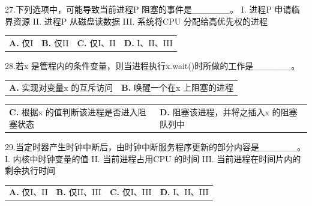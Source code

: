 \documentclass[UTF8,11pt]{ctexart}
\begin{document}
27.下列选项中，可能导致当前进程P 阻塞的事件是\_\_\_\_\_\_。 I. 进程P 申请临界资源 II. 进程P 从磁盘读数据 III. 系统将CPU 分配给高优先权的进程


\begin{center}\begin{tabular}{>{\raggedright\arraybackslash}p{\dimexpr(\linewidth-8\tabcolsep)/4\relax}>{\raggedright\arraybackslash}p{\dimexpr(\linewidth-8\tabcolsep)/4\relax}>{\raggedright\arraybackslash}p{\dimexpr(\linewidth-8\tabcolsep)/4\relax}>{\raggedright\arraybackslash}p{\dimexpr(\linewidth-8\tabcolsep)/4\relax}}
\textbf{A.} 仅I & \textbf{B.} 仅II & \textbf{C.} 仅I、II & \textbf{D.} I、II、III\\[.35em]\end{tabular}\end{center}

28.若x 是管程内的条件变量，则当进程执行x.wait()时所做的工作是\_\_\_\_\_\_。


\begin{center}\begin{tabular}{>{\raggedright\arraybackslash}p{\dimexpr(\linewidth-4\tabcolsep)/2\relax}>{\raggedright\arraybackslash}p{\dimexpr(\linewidth-4\tabcolsep)/2\relax}}
\textbf{A.} 实现对变量x 的互斥访问 & \textbf{B.} 唤醒一个在x 上阻塞的进程\\[.35em]\end{tabular}\end{center}

\begin{center}\begin{tabular}{>{\raggedright\arraybackslash}p{\dimexpr(\linewidth-4\tabcolsep)/2\relax}>{\raggedright\arraybackslash}p{\dimexpr(\linewidth-4\tabcolsep)/2\relax}}
\textbf{C.} 根据x 的值判断该进程是否进入阻塞状态 & \textbf{D.} 阻塞该进程，并将之插入x 的阻塞队列中\\[.35em]\end{tabular}\end{center}

29.当定时器产生时钟中断后，由时钟中断服务程序更新的部分内容是\_\_\_\_\_\_。 I. 内核中时钟变量的值 II. 当前进程占用CPU 的时间 III. 当前进程在时间片内的剩余执行时间


\begin{center}\begin{tabular}{>{\raggedright\arraybackslash}p{\dimexpr(\linewidth-8\tabcolsep)/4\relax}>{\raggedright\arraybackslash}p{\dimexpr(\linewidth-8\tabcolsep)/4\relax}>{\raggedright\arraybackslash}p{\dimexpr(\linewidth-8\tabcolsep)/4\relax}>{\raggedright\arraybackslash}p{\dimexpr(\linewidth-8\tabcolsep)/4\relax}}
\textbf{A.} 仅I、II & \textbf{B.} 仅II、III & \textbf{C.} 仅I、III & \textbf{D.} I、II、III\\[.35em]\end{tabular}\end{center}
\end{document}
